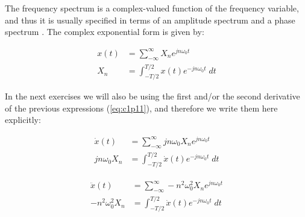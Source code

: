 The frequency spectrum is a complex-valued function of the frequency variable, 
and thus it is usually specified in terms of an amplitude spectrum and a phase spectrum 
\cite{kamen2000fundamentals}. The complex exponential form is given by:

\begin{equation}
\begin{aligned}
x(t) &= \displaystyle\sum_{- \infty}^{\infty} X_n e^{j n \omega_0 t} \\
X_n &= \displaystyle\int_{-T/2}^{T/2} x(t) e^{-j n \omega_0 t} \; dt 
\label{eq:c11}
\end{aligned}
\end{equation}

In the next exercises we will also be using the first and/or the second 
derivative of the previous expressions (\ref{eq:c1p11}), and therefore
we write them here explicitly:

\begin{equation}
\begin{aligned}
\dot{x}(t) &= \displaystyle\sum_{- \infty}^{\infty} j n \omega_0 X_n e^{j n \omega_0 t} \\
j n \omega_0 X_n &= \displaystyle\int_{-T/2}^{T/2} \dot{x}(t) e^{-j n \omega_0 t} \; dt 
\label{eq:c12}
\end{aligned}
\end{equation}

\begin{equation}
\begin{aligned}
\ddot{x}(t) &= \displaystyle\sum_{- \infty}^{\infty} - n^2 \omega_0^2 X_n e^{j n \omega_0 t} \\
-n^2 \omega_0^2 X_n &= \displaystyle\int_{-T/2}^{T/2} \dot{x}(t) e^{-j n \omega_0 t} \; dt 
\label{eq:c13}
\end{aligned}
\end{equation}

